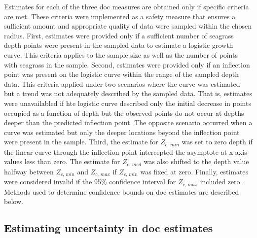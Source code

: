 \documentclass[letterpaper,12pt,oneside]{article}\usepackage[]{graphicx}\usepackage[]{color}
\begin{document}
Estimates for each of the three \ac{doc} measures are obtained only if specific criteria are met.  These criteria were implemented as a safety measure that ensures a sufficient amount and appropriate quality of data were sampled within the chosen radius.  First, estimates were provided only if a sufficient number of seagrass depth points were present in the sampled data to estimate a logistic growth curve.  This criteria applies to the sample size as well as the number of points with seagrass in the sample.  Second, estimates were provided only if an inflection point was present on the logistic curve within the range of the sampled depth data.  This criteria applied under two scenarios where the curve was estimated but a trend was not adequately described by the sampled data.  That is, estimates were unavailabled if hte logistic curve described only the initial decrease in points occupied as a function of depth but the observed points do not occur at depths deeper than the predicted inflection point.  The opposite scenario occurred when a curve was estimated but only the deeper locations beyond the inflection point were present in the sample.  Third, the estimate for $Z_{c,\,min}$ was set to zero depth if the linear curve through the inflection point intercepted the asymptote at x-axis values less than zero.  The estimate for $Z_{c,\,med}$ was also shifted to the depth value halfway between $Z_{c,\,min}$ and $Z_{c,\,max}$ if $Z_{c,\,min}$ was fixed at zero.  Finally, estimates were considered invalid if the 95\% confidence interval for $Z_{c,\,max}$ included zero.  Methods used to  determine confidence bounds on \ac{doc} estimates are described below.  

\subsection{Estimating uncertainty in \acl{doc} estimates}
\end{document}
